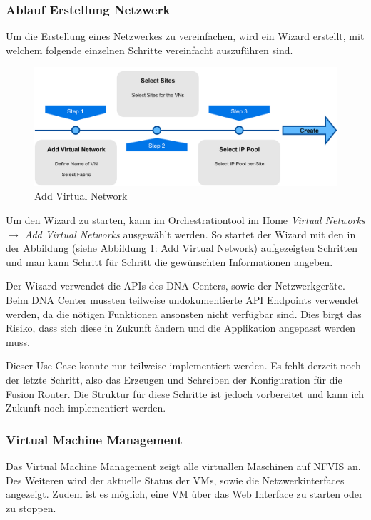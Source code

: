 \subsubsection{Ablauf Erstellung Netzwerk}
Um die Erstellung eines Netzwerkes zu vereinfachen, wird ein Wizard erstellt, mit welchem folgende einzelnen Schritte vereinfacht auszuführen sind. 

\begin{figure}[H]
	\centering
	\includegraphics[width=0.8\linewidth]{img/Abstrahierung/addvirtualnetwork}
	\caption{Add Virtual Network}
	\label{fig:Add Virtual Network}
\end{figure}

Um den Wizard zu starten, kann im Orchestrationtool im Home \textit{Virtual Networks $\rightarrow$ Add Virtual Networks} ausgewählt werden. So startet der Wizard mit den in der Abbildung (siehe Abbildung \ref{fig:Add Virtual Network}: Add Virtual Network) aufgezeigten Schritten und man kann Schritt für Schritt die gewünschten Informationen angeben.

Der Wizard verwendet die APIs des DNA Centers, sowie der Netzwerkgeräte. Beim DNA Center mussten teilweise undokumentierte API Endpoints verwendet werden, da die nötigen Funktionen ansonsten nicht verfügbar sind. Dies birgt das Risiko, dass sich diese in Zukunft ändern und die Applikation angepasst werden muss.

Dieser Use Case konnte nur teilweise implementiert werden. Es fehlt derzeit noch der letzte Schritt, also das Erzeugen und Schreiben der Konfiguration für die Fusion Router. Die Struktur für diese Schritte ist jedoch vorbereitet und kann ich Zukunft noch implementiert werden.

\subsubsection{Virtual Machine Management}

Das Virtual Machine Management zeigt alle virtuallen Maschinen auf NFVIS an. Des Weiteren wird der aktuelle Status der VMs, sowie die Netzwerkinterfaces angezeigt. Zudem ist es möglich, eine VM über das Web Interface zu starten oder zu stoppen.

